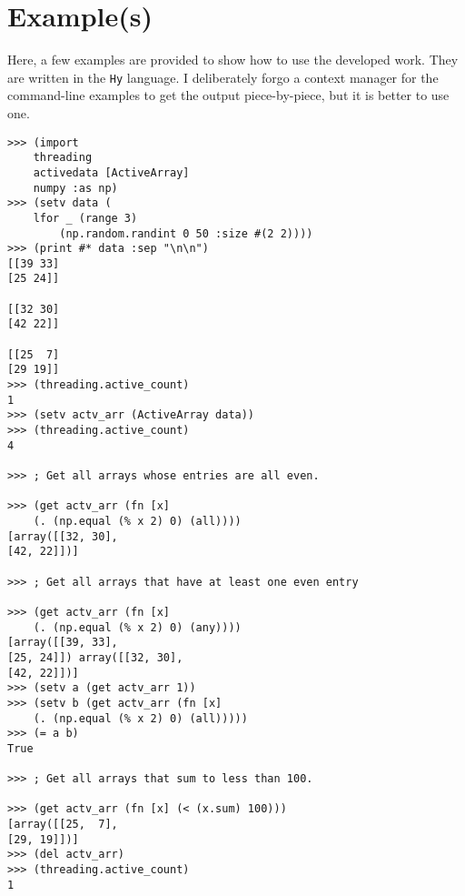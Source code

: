 \documentclass[10pt]{article}
\begin{document}
\newpage
\section{Example(s)}
	Here, a few examples are provided to show how to use the developed work. They are written in the \lstinline|Hy| language. I deliberately forgo a context manager for the command-line examples to get the output piece-by-piece, but it is better to use one.
	
\begin{lstlisting}
>>> (import
	threading
	activedata [ActiveArray]
	numpy :as np)
>>> (setv data (
	lfor _ (range 3) 
		(np.random.randint 0 50 :size #(2 2))))
>>> (print #* data :sep "\n\n")
[[39 33]
[25 24]]

[[32 30]
[42 22]]

[[25  7]
[29 19]]
>>> (threading.active_count)
1
>>> (setv actv_arr (ActiveArray data))
>>> (threading.active_count)
4

>>> ; Get all arrays whose entries are all even.

>>> (get actv_arr (fn [x]
	(. (np.equal (% x 2) 0) (all))))
[array([[32, 30],
[42, 22]])]

>>> ; Get all arrays that have at least one even entry

>>> (get actv_arr (fn [x]
	(. (np.equal (% x 2) 0) (any))))
[array([[39, 33],
[25, 24]]) array([[32, 30],
[42, 22]])]	
>>> (setv a (get actv_arr 1))
>>> (setv b (get actv_arr (fn [x]
	(. (np.equal (% x 2) 0) (all)))))
>>> (= a b)
True

>>> ; Get all arrays that sum to less than 100.

>>> (get actv_arr (fn [x] (< (x.sum) 100)))
[array([[25,  7],
[29, 19]])]
>>> (del actv_arr)
>>> (threading.active_count)
1
\end{lstlisting}
\end{document}
